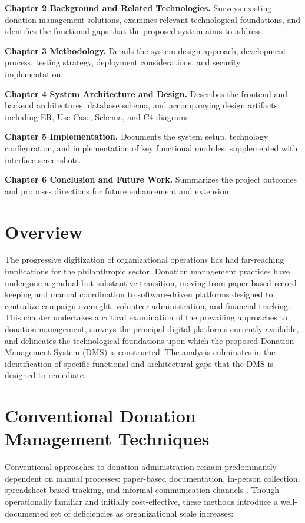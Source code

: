 \documentclass{thesis-library}
\begin{document}
\textbf{Chapter 2 Background and Related Technologies.} Surveys existing donation management solutions, examines relevant technological foundations, and identifies the functional gaps that the proposed system aims to address.

\textbf{Chapter 3 Methodology.} Details the system design approach, development process, testing strategy, deployment considerations, and security implementation.

\textbf{Chapter 4 System Architecture and Design.} Describes the frontend and backend architectures, database schema, and accompanying design artifacts including ER, Use Case, Schema, and C4 diagrams.

\textbf{Chapter 5 Implementation.} Documents the system setup, technology configuration, and implementation of key functional modules, supplemented with interface screenshots.

\textbf{Chapter 6 Conclusion and Future Work.} Summarizes the project outcomes and proposes directions for future enhancement and extension.


\section{Overview}
The progressive digitization of organizational operations has had far-reaching implications for the philanthropic sector. Donation management practices have undergone a gradual but substantive transition, moving from paper-based record-keeping and manual coordination to software-driven platforms designed to centralize campaign oversight, volunteer administration, and financial tracking. This chapter undertakes a critical examination of the prevailing approaches to donation management, surveys the principal digital platforms currently available, and delineates the technological foundations upon which the proposed Donation Management System (DMS) is constructed. The analysis culminates in the identification of specific functional and architectural gaps that the DMS is designed to remediate.

\section{Conventional Donation Management Techniques}

Conventional approaches to donation administration remain predominantly dependent on manual processes: paper-based documentation, in-person collection, spreadsheet-based tracking, and informal communication channels \cite{robinson2019digital,kalinda2022university}. Though operationally familiar and initially cost-effective, these methods introduce a well-documented set of deficiencies as organizational scale increases:
\end{document}
